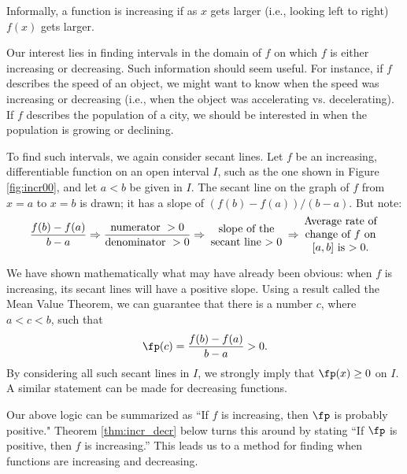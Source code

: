 Informally, a function is increasing if as $x$ gets larger (i.e., looking left to right) $f(x)$ gets larger.

Our interest lies in finding intervals in the domain of $f$ on which $f$ is either increasing or decreasing. Such information should seem useful. For instance, if $f$ describes the speed of an object, we might want to know when the speed was increasing or decreasing (i.e., when the object was accelerating vs. decelerating). If $f$ describes the population of a city, we should be interested in when the population is growing or declining.

To find such intervals, we again consider secant lines. Let $f$ be an increasing, differentiable function on an open interval $I$, such as the one shown in Figure \ref{fig:incr00}, and let $a<b$ be given in $I$. The secant line on the graph of $f$ from $x=a$ to $x=b$ is drawn; it has a slope of $(f(b)-f(a))/(b-a)$. But note:
\[
\frac{f(b)-f(a)}{b-a} \Rightarrow \frac{\text{numerator }>0}{\text{denominator } >0} \Rightarrow \parbox{70pt}{\centering slope of the secant line $>0$} \Rightarrow \parbox{70pt}{\centering Average rate of change of $f$ on $[a,b]$ is $>0$.}
\]



We have shown mathematically what may have already been obvious: when $f$ is increasing, its secant lines will have a positive slope. Using a result called the Mean Value Theorem, we can guarantee that there is a number $c$, where $a<c<b$, such that 
\[
\fp(c) = \frac{f(b)-f(a)}{b-a}>0.
\]
 By considering all such secant lines in $I$, we strongly imply that $\fp(x) \geq 0$ on $I$. A similar statement can be made for decreasing functions.

Our above logic can be summarized as ``If $f$ is increasing, then $\fp$ is probably  positive." Theorem \ref{thm:incr_decr} below turns this around by stating ``If $\fp$ is positive, then $f$ is increasing.'' This leads us to a method for finding when functions are increasing and decreasing.

